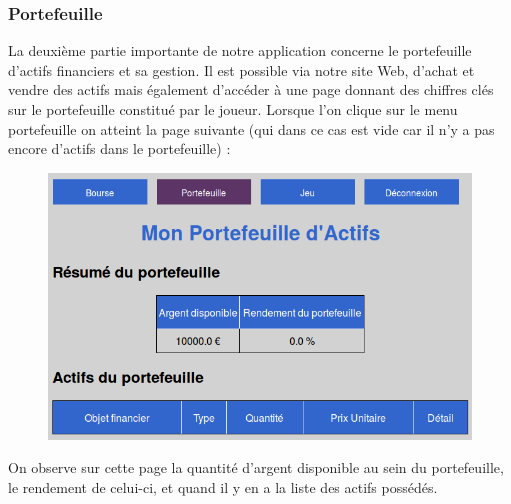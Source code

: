\begin{enumerate}
      \end{enumerate}
    
    \subsubsection{Portefeuille}
    La deuxième partie importante de notre application concerne le portefeuille d'actifs financiers et sa gestion. Il est possible via notre site Web, d'achat et vendre des actifs mais également d'accéder à une page donnant des chiffres clés sur le portefeuille constitué par le joueur. Lorsque l'on clique sur le menu portefeuille on atteint la page suivante (qui dans ce cas est vide car il n'y a pas encore d'actifs dans le portefeuille) :\\
    \begin{figure}[H]
      \center
      \includegraphics[scale=0.5]{../graph/7-accueilportefeuillevide.png}
    \end{figure}
    On observe sur cette page la quantité d'argent disponible au sein du portefeuille, le rendement de celui-ci, et quand il y en a la liste des actifs possédés.
      
